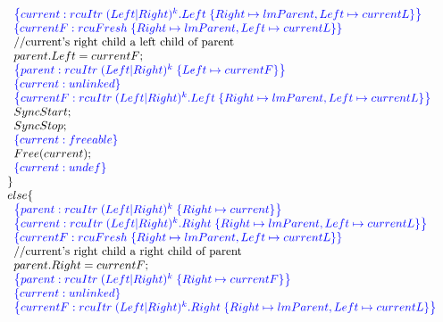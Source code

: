\[\begin{array}{@{}l@{}}
                \;\;\;\;\;\;\;\;\specline{current:rcuItr\; (Left|Right)^{k}.Left \; \{Right\mapsto lmParent, Left \mapsto currentL \} }\\
                \;\;\;\;\;\;\;\;\specline{currentF:rcuFresh \; \{Right\mapsto lmParent, Left\mapsto currentL\}}\\
                \;\;\;\;\;\;\;\;\text{//current's right child a left child of parent}\\
                \;\;\;\;\;\;\;\;parent.Left = currentF; \\
                \;\;\;\;\;\;\;\;\specline{parent:rcuItr\; (Left|Right)^{k} \; \{ Left\mapsto currentF\} }\\
                \;\;\;\;\;\;\;\;\specline{current:unlinked }\\
                \;\;\;\;\;\;\;\;\specline{currentF:rcuItr \; (Left|Right)^{k}.Left \; \{Right\mapsto lmParent, Left\mapsto currentL\}}\\
                \;\;\;\;\;\;\;\;SyncStart;\\
                \;\;\;\;\;\;\;\;SyncStop;\\
                \;\;\;\;\;\;\;\;\specline{current:freeable}\\
                \;\;\;\;\;\;\;\;Free(current);\\
                \;\;\;\;\;\;\;\;\specline{current:undef}\\
            \;\;\;\;\;\;\} \\
            \;\;\;\;\;\;else\{ \\
                \;\;\;\;\;\;\;\;\specline{parent:rcuItr\; (Left|Right)^{k} \; \{ Right\mapsto current\}}\\
                \;\;\;\;\;\;\;\;\specline{current:rcuItr\; (Left|Right)^{k}.Right \; \{Right\mapsto lmParent, Left \mapsto currentL \}}\\
                \;\;\;\;\;\;\;\;\specline{currentF:rcuFresh \; \{Right\mapsto lmParent, Left\mapsto currentL\}}\\
                \;\;\;\;\;\;\;\;\text{//current's right child a right child of parent}\\
                \;\;\;\;\;\;\;\;parent.Right = currentF; \\
                \;\;\;\;\;\;\;\;\specline{parent:rcuItr\; (Left|Right)^{k} \; \{ Right\mapsto currentF\} }\\
                \;\;\;\;\;\;\;\;\specline{current:unlinked }\\
                \;\;\;\;\;\;\;\;\specline{currentF:rcuItr \; (Left|Right)^{k}.Right \; \{Right\mapsto lmParent, Left\mapsto currentL\}}\\

\end{array}\]
